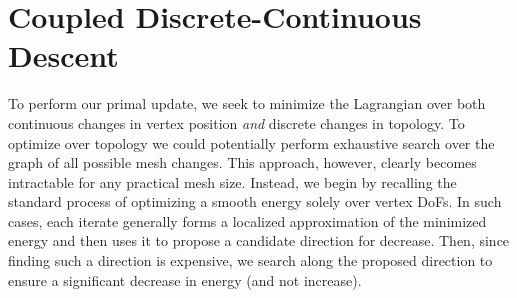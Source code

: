 

\section{Coupled Discrete-Continuous Descent}
\label{sec:topologySearch}
To perform our primal update, we seek to minimize the Lagrangian
over both continuous changes in vertex position \emph{and} discrete changes in topology. 
%
To optimize over topology we could potentially perform exhaustive search over the graph of all possible mesh changes. This approach, however, clearly becomes intractable for any practical mesh size. 
Instead, we begin by recalling the standard process of optimizing a smooth energy solely over vertex DoFs. In such cases, each iterate generally forms a localized approximation of the minimized energy  and then uses it to propose a candidate direction for decrease. Then, since finding such a direction is expensive, we search along the proposed direction to ensure a significant decrease in energy (and not increase). 

